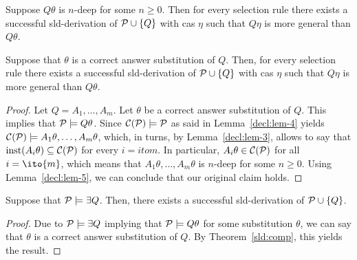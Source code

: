 \begin{lem}
    \label{decl:lem-5}
    Suppose \(Q\theta\) is \(n\)-deep for some \(n \ge 0\).
    Then for every selection rule  there exists a successful \gls{sld}-derivation of \(\mathcal{P} \cup \lbrace Q \rbrace\) with \gls{cas} \(\eta\) such that \(Q\eta\) is more general than \(Q\theta\).
\end{lem}

\begin{thm}
    \label{sld:comp}
    Suppose that \(\theta\) is a correct answer substitution of \(Q\).
    Then, for every selection rule  there exists a successful \gls{sld}-derivation of \(\mathcal{P} \cup \lbrace Q \rbrace\) with \gls{cas} \(\eta\) such that \(Q\eta\) is more general than \(Q\theta\).        
\end{thm}
\begin{proof}
    Let \(Q = A_1,\dotsc,A_m\).
    Let \(\theta\) be a correct answer substitution of \(Q\).
    This implies that \(\mathcal{P} \models Q\theta\).
    Since \(\mathcal{C}(\mathcal{P}) \models \mathcal{P}\) as said in Lemma~\ref{decl:lem-4} yields \(\mathcal{C}(\mathcal{P}) \models A_1\theta,\dotsc,A_m\theta\), which, in turns, by Lemma~\ref{decl:lem-3}, allows to say that \(\operatorname{inst}(A_i\theta) \subseteq \mathcal{C}(\mathcal{P})\) for every \(i = ito{m}\).
    In particular, \(A_i\theta \in \mathcal{C}(\mathcal{P})\) for all \(i = \ito{m}\), which means that \(A_1\theta,\dotsc,A_m\theta\) is \(n\)-deep for some \(n \ge 0\).
    Using Lemma~\ref{decl:lem-5}, we can conclude that our original claim holds.
\end{proof}

\begin{cor}
    Suppose that \(\mathcal{P} \models \exists{Q}\).
    Then, there exists a successful \gls{sld}-derivation of \(\mathcal{P} \cup \lbrace Q \rbrace\).
\end{cor}
\begin{proof}
    Due to \(\mathcal{P} \models \exists{Q}\) implying that \(\mathcal{P} \models Q\theta\) for some substitution \(\theta\), we can say that \(\theta\) is a correct answer substitution of \(Q\).
    By Theorem~\ref{sld:comp}, this yields the result.
\end{proof}

